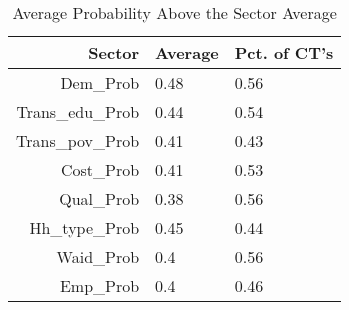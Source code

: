 \begin{table}[ht]
    \caption{Average Probability Above the Sector Average }
    \label{tab:prob_above_mean}
    \centering
    \begin{tabular}{|r|l|l|}
      \hline
     Sector & Average & Pct. of CT's \\ 
      \hline
    Dem\_Prob & 0.48 & 0.56 \\ 
    \hline
      Trans\_edu\_Prob & 0.44 & 0.54 \\ 
      \hline
      Trans\_pov\_Prob & 0.41 & 0.43 \\ 
      \hline
      Cost\_Prob & 0.41 & 0.53 \\ 
      \hline
      Qual\_Prob & 0.38 & 0.56 \\ 
      \hline
      Hh\_type\_Prob & 0.45 & 0.44 \\ 
      \hline
      Waid\_Prob & 0.4 & 0.56 \\ 
      \hline
      Emp\_Prob & 0.4 & 0.46 \\ 
       \hline
    \end{tabular}
    \end{table}